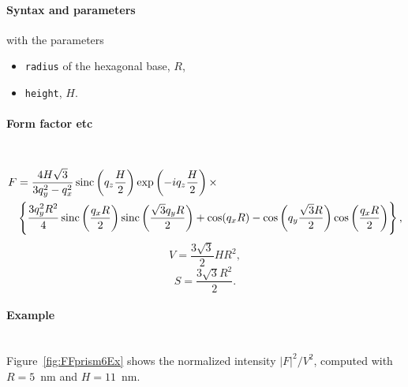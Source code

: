 \FloatBarrier

\paragraph{Syntax and parameters}
\begin{quote}
\end{quote}
with the parameters
\begin{itemize}
\item \texttt{radius} of the hexagonal base, $R$,
\item \texttt{height}, $H$.
\end{itemize}


\paragraph{Form factor etc}\strut\\
\begin{align*}
F &= \frac{4H\sqrt{3}}{3q_y^2 - q_x^2}
\operatorname{sinc}\left(q_z\frac{H}{2}\right) \exp\left(-i q_z\frac{ H}{2}\right)\times\\
&\left\{\frac{3q_y^2R^2}{4} \operatorname{sinc}\left(\frac{q_x
  R}{2}\right)\operatorname{sinc}\left(\frac{\sqrt{3}q_yR }{2}\right)+ \cos(q_x R)-\cos\left(q_y
\frac{\sqrt{3}R}{2}\right) \cos\left(\frac{q_x R}{2}\right)\right\},
\end{align*}
\begin{equation*}
  V = \dfrac{3\sqrt{3}}{2}H R^2,
\end{equation*}
\begin{equation*}
  S =\dfrac{3\sqrt{3}R^2}{2}.
\end{equation*}

\paragraph{Example}\strut\\
Figure~\ref{fig:FFprism6Ex} shows the normalized intensity
$|F|^2/V^2$, computed with $R=5$~nm and \mbox{$H=11$~nm.}

